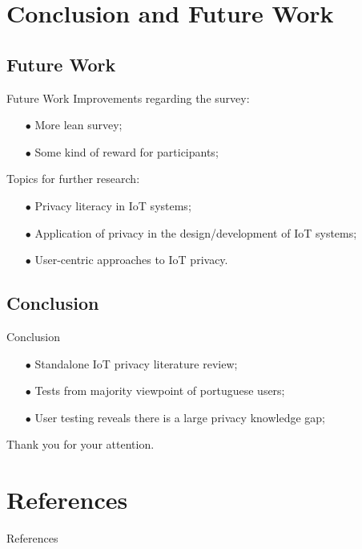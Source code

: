 \documentclass[xcolor={svgnames},compress,aspectratio=169]{beamer}
\begin{document}
\section{Conclusion and Future Work}

\subsection{Future Work}

\begin{frame}{Future Work}
    Improvements regarding the survey:
    \begin{itemize}
        \item[$\bullet$]
        More lean survey;
        \item[$\bullet$]
        Some kind of reward for participants;
    \end{itemize}
    Topics for further research:
    \begin{itemize}
        \item[$\bullet$]
        Privacy literacy in IoT systems;
        \item[$\bullet$]
        Application of privacy in the design/development of IoT systems;
        \item[$\bullet$]
        User-centric approaches to IoT privacy.
    \end{itemize}
\end{frame}


\subsection{Conclusion}

\begin{frame}{Conclusion}
    \begin{itemize}
        \item[$\bullet$]
        Standalone IoT privacy literature review;
        \item[$\bullet$]
        Tests from majority viewpoint of portuguese users;
        \item[$\bullet$]
        User testing reveals there is a large privacy knowledge gap;
    \end{itemize}
\end{frame}


\begin{frame}
    \begin{center}
        {\large Thank you for your attention.}
    \end{center}
\end{frame}

\section*{References}

\begin{frame}[allowframebreaks]{References}
    
    {\footnotesize }
\end{frame}
\end{document}
